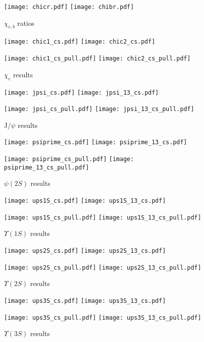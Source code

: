 \documentclass{article}
\begin{document}
\begin{figure}
\centering
\texttt{[image: chicr.pdf]}
\texttt{[image: chibr.pdf]}
\caption{$\chi_{c,b}$ ratios}
\end{figure}

\begin{figure}
\centering
\texttt{[image: chic1\_cs.pdf]}
\texttt{[image: chic2\_cs.pdf]}

\texttt{[image: chic1\_cs\_pull.pdf]}
\texttt{[image: chic2\_cs\_pull.pdf]}
\caption{$\chi_c$ results}
\end{figure}

\clearpage

\begin{figure}
\centering
\texttt{[image: jpsi\_cs.pdf]}
\texttt{[image: jpsi\_13\_cs.pdf]}

\texttt{[image: jpsi\_cs\_pull.pdf]}
\texttt{[image: jpsi\_13\_cs\_pull.pdf]}
\caption{J/$\psi$ results}
\end{figure}

\clearpage

\begin{figure}
\centering
\texttt{[image: psiprime\_cs.pdf]}
\texttt{[image: psiprime\_13\_cs.pdf]}

\texttt{[image: psiprime\_cs\_pull.pdf]}
\texttt{[image: psiprime\_13\_cs\_pull.pdf]}
\caption{$\psi(2S)$ results}
\end{figure}

\clearpage

\begin{figure}
\centering
\texttt{[image: ups1S\_cs.pdf]}
\texttt{[image: ups1S\_13\_cs.pdf]}

\texttt{[image: ups1S\_cs\_pull.pdf]}
\texttt{[image: ups1S\_13\_cs\_pull.pdf]}
\caption{$\Upsilon(1S)$ results}
\end{figure}

\clearpage

\begin{figure}
\centering
\texttt{[image: ups2S\_cs.pdf]}
\texttt{[image: ups2S\_13\_cs.pdf]}

\texttt{[image: ups2S\_cs\_pull.pdf]}
\texttt{[image: ups2S\_13\_cs\_pull.pdf]}
\caption{$\Upsilon(2S)$ results}
\end{figure}

\clearpage

\begin{figure}
\centering
\texttt{[image: ups3S\_cs.pdf]}
\texttt{[image: ups3S\_13\_cs.pdf]}

\texttt{[image: ups3S\_cs\_pull.pdf]}
\texttt{[image: ups3S\_13\_cs\_pull.pdf]}
\caption{$\Upsilon(3S)$ results}
\end{figure}

\clearpage


\end{document}
